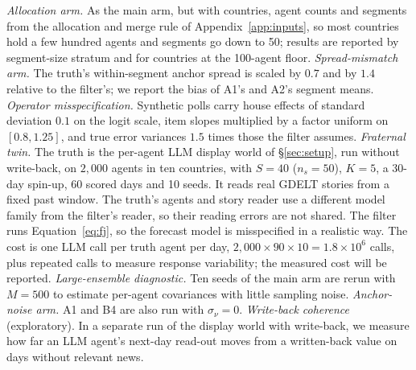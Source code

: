 \documentclass[10pt]{article}
\theoremstyle{remark}
\begin{document}
\emph{Allocation arm.} As the main arm, but with countries, agent counts and segments from the allocation and merge rule of Appendix~\ref{app:inputs}, so most countries hold a few hundred agents and segments go down to 50; results are reported by segment-size stratum and for countries at the 100-agent floor.
\emph{Spread-mismatch arm.} The truth's within-segment anchor spread is scaled by $0.7$ and by $1.4$ relative to the filter's; we report the bias of A1's and A2's segment means.
\emph{Operator misspecification.} Synthetic polls carry house effects of standard deviation $0.1$ on the logit scale, item slopes multiplied by a factor uniform on $[0.8,1.25]$, and true error variances $1.5$ times those the filter assumes.
\emph{Fraternal twin.} The truth is the per-agent LLM display world of \S\ref{sec:setup}, run without write-back, on $2{,}000$ agents in ten countries, with $S=40$ ($n_s=50$), $K=5$, a 30-day spin-up, 60 scored days and 10 seeds. It reads real GDELT stories from a fixed past window. The truth's agents and story reader use a different model family from the filter's reader, so their reading errors are not shared. The filter runs Equation~\eqref{eq:fj}, so the forecast model is misspecified in a realistic way. The cost is one LLM call per truth agent per day, $2{,}000\times90\times10=1.8\times10^6$ calls, plus repeated calls to measure response variability; the measured cost will be reported.
\emph{Large-ensemble diagnostic.} Ten seeds of the main arm are rerun with $M=500$ to estimate per-agent covariances with little sampling noise.
\emph{Anchor-noise arm.} A1 and B4 are also run with $\sigma_\nu=0$.
\emph{Write-back coherence} (exploratory). In a separate run of the display world with write-back, we measure how far an LLM agent's next-day read-out moves from a written-back value on days without relevant news.
\end{document}

